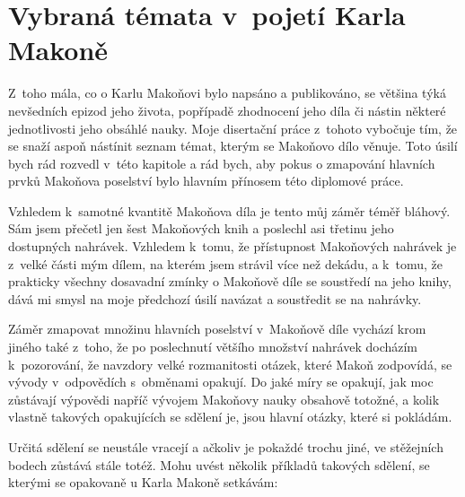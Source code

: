 \chapter{Vybraná témata v~pojetí Karla Makoně}
\label{kap:temata}

Z~toho mála, co o Karlu Makoňovi bylo napsáno a publikováno, se většina týká
nevšedních epizod jeho života, popřípadě zhodnocení jeho díla či nástin některé
jednotlivosti jeho obsáhlé nauky. Moje disertační práce z~tohoto vybočuje tím,
že se snaží aspoň nástínit seznam témat, kterým se Makoňovo dílo věnuje. Toto
úsilí bych rád rozvedl v~této kapitole a rád bych, aby pokus o zmapování
hlavních prvků Makoňova poselství bylo hlavním přínosem této diplomové práce.

Vzhledem k~samotné kvantitě Makoňova díla je tento můj záměr téměř bláhový. Sám
jsem přečetl jen šest Makoňových knih a poslechl asi třetinu jeho
dostupných nahrávek. Vzhledem k~tomu, že přístupnost Makoňových nahrávek je
z~velké části mým dílem, na kterém jsem strávil více než dekádu, a k~tomu, že
prakticky všechny dosavadní zmínky o Makoňově díle se soustředí na jeho knihy,
dává mi smysl na moje předchozí úsilí navázat a soustředit se na nahrávky.

Záměr zmapovat množinu hlavních poselství v~Makoňově díle vychází krom jiného
také z~toho, že po poslechnutí většího množství nahrávek docházím k~pozorování,
že navzdory velké rozmanitosti otázek, které Makoň zodpovídá, se vývody
v~odpovědích s~obměnami opakují. Do jaké míry se opakují, jak moc zůstávají
výpovědi napříč vývojem Makoňovy nauky obsahově totožné, a kolik vlastně
takových opakujících se sdělení je, jsou hlavní otázky, které si pokládám.

Určitá sdělení se
neustále vracejí a ačkoliv je pokaždé trochu jiné, ve stěžejních bodech zůstává
stále totéž. Mohu uvést několik příkladů takových sdělení, se kterými se
opakovaně u Karla Makoně setkávám:

